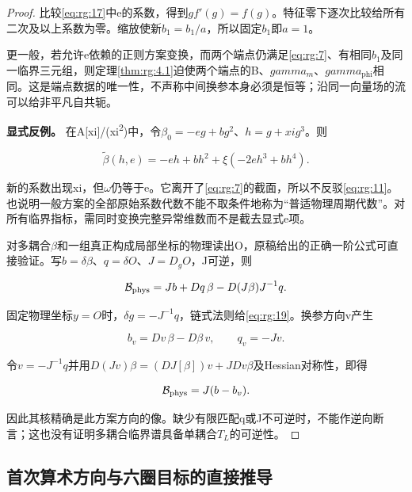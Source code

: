 \documentclass[11pt,a4paper,oneside]{ctexart}
\theoremstyle{cnplain}
\theoremstyle{definition}
\theoremstyle{remark}
\numberwithin{equation}{section}
\begin{document}
\begin{proof}

比较\eqref{eq:rg:17}中e的系数，得到\(g f'(g)=f(g)\)。特征零下逐次比较给所有二次及以上系数为零。缩放使新\(b_1=b_1/a\)，所以固定\(b_1\)即\(a=1\)。

更一般，若允许e依赖的正则方案变换，而两个端点仍满足\eqref{eq:rg:7}、有相同\(b_1\)及同一临界三元组，则定理\ref{thm:rg:4.1}迫使两个端点的B、\(gamma_m\)、\(gamma_{\mathrm{phi}}\)相同。这是端点数据的唯一性，不声称中间换参本身必须是恒等；沿同一向量场的流可以给非平凡自共轭。

\textbf{显式反例。} 在A{[}xi{]}/(xi\textsuperscript{2})中，令\(\beta _0=-eg+b g^{2}\)、\(h=g+xi g^{3}\)。则

\begin{equation}
\widetilde\beta(h,e)=-eh+b h^{2}+
                 \xi(-2e h^{3}+b h^{4}).               \label{eq:rg:18}
\end{equation}

新的系数出现xi，但\(\omega\)仍等于e。它离开了\eqref{eq:rg:7}的截面，所以不反驳\eqref{eq:rg:11}。也说明一般方案的全部原始系数代数不能不取条件地称为``普适物理周期代数''。对所有临界指标，需同时变换完整异常维数而不是截去显式e项。

对多耦合\(\beta\)和一组真正构成局部坐标的物理读出O，原稿给出的正确一阶公式可直接验证。写\(b=\delta  \beta\)、\(q=\delta  O\)、\(J=D_g O\)，J可逆，则

\begin{equation}
{\cal B}_{\rm phys}=Jb+Dq\,\beta-D(J\beta)J^{-1}q. \label{eq:rg:19}
\end{equation}

固定物理坐标\(y=O\)时，\(\delta  g=-J^{-1}q\)，链式法则给\eqref{eq:rg:19}。换参方向v产生

\begin{equation}
b_v=Dv\,\beta-D\beta\,v,\qquad q_v=-Jv.
\end{equation}

令\(v=-J^{-1}q\)并用\(D(Jv) \beta =(DJ[\beta ])v+J Dv \beta\)及Hessian对称性，即得

\begin{equation}
{\cal B}_{\rm phys}=J(b-b_v).
\end{equation}

因此其核精确是此方案方向的像。缺少有限匹配q或J不可逆时，不能作逆向断言；这也没有证明多耦合临界谱具备单耦合\(T_L\)的可逆性。

\end{proof}


\subsection{首次算术方向与六圈目标的直接推导}\label{sec:rg:7}
\end{document}
